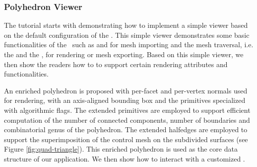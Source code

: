 \documentclass[twocolumn]{article}
\begin{document}
\subsubsection*{Polyhedron Viewer}




The tutorial starts with demonstrating how to implement a simple
viewer based on the default configuration of the \cgalpoly . This
simple viewer demonstrates some basic functionalities of the
\cgalpoly\ such as  and  
for mesh importing and the mesh traversal, i.e. the 
and the , for rendering or mesh exporting.  Based
on this simple viewer, we then show the readers how to
 to support certain rendering attributes and 
functionalities.

An enriched polyhedron is proposed with per-facet and per-vertex
normals used for rendering, with an axis-aligned bounding box and the
primitives specialized with algorithmic flags. The extended primitives
are employed to support efficient computation of the number of
connected components, number of boundaries and combinatorial genus of
the polyhedron. The extended halfedges are employed to support the
superimposition of the control mesh on the subdivided surfaces (see
Figure \ref{fig:quad-triangle}). This enriched polyhedron is used as
the core data structure of our application.  We then show how to
interact with a customized \poly.
\end{document}
